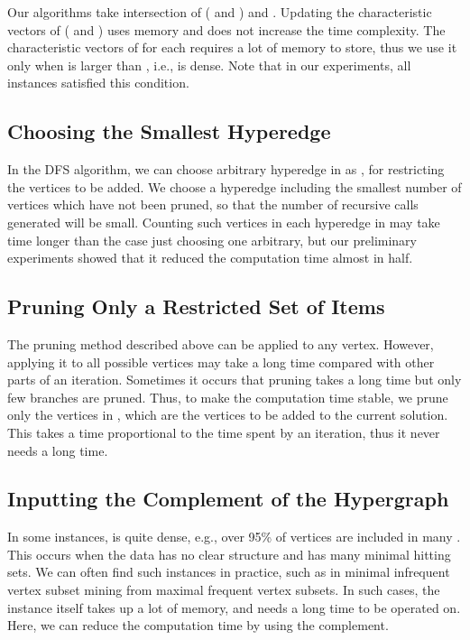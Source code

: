 Our algorithms take intersection of ( and ) and .
Updating the characteristic vectors of ( and ) uses
  memory and does not increase the time complexity.
The characteristic vectors of  for each  requires a lot of memory
 to store, thus we use it only when  is larger than
 , i.e.,  is dense.
Note that in our experiments, all instances satisfied this condition.

\subsection{Choosing the Smallest Hyperedge}

In the DFS algorithm, we can choose arbitrary hyperedge in  as ,
 for restricting the vertices to be added.
We choose a hyperedge including the smallest number of vertices which have not
 been pruned, so that the number of recursive calls generated will be small.
Counting such vertices in each hyperedge in  may take time longer
 than the case just choosing one arbitrary, but our preliminary experiments
 showed that it reduced the computation time almost in half.





\subsection{ Pruning Only a Restricted Set of Items}

The pruning method described above can be applied to any vertex.
However, applying it to all possible vertices may take a long time compared
 with other parts of an iteration.
Sometimes it occurs that pruning takes a long time but only few branches
 are pruned.
Thus, to make the computation time stable, we prune only the vertices in
 , which are the vertices to be added to the current solution.
This takes a time proportional to the time spent by an iteration,
 thus it never needs a long time.

\subsection{Inputting the Complement of the Hypergraph}

In some instances,  is quite dense, e.g., over 95\% of vertices
 are included in many .
This occurs when the data has no clear structure and has many minimal
 hitting sets.
We can often find such instances in practice, such as in minimal infrequent
 vertex subset mining from maximal frequent vertex subsets.
In such cases, the instance itself takes up a lot of memory, and needs a
 long time to be operated on.
Here, we can reduce the computation time by using the complement.

